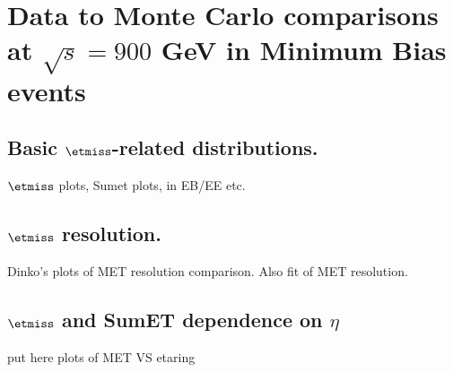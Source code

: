 \section{Data to Monte Carlo comparisons at $\sqrt{s}=900$ GeV in
  Minimum Bias events}


\subsection{Basic $\etmiss$-related distributions.}
$\etmiss$ plots, Sumet plots, in EB/EE etc.

\subsection{$\etmiss$ resolution.}
Dinko's plots of MET resolution comparison. Also fit of MET resolution.

\subsection{$\etmiss$ and SumET dependence on $\eta$}
put here plots of MET VS etaring
